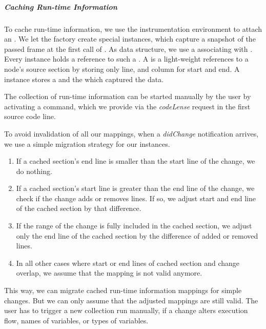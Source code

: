     \subparagraph{Caching Run-time Information}
    To cache run-time information, we use the instrumentation environment to attach an . We let the factory create special  instances, which capture a snapshot of the passed frame at the first call of . As data structure, we use a  associating  with . Every  instance holds a reference to such a . A  is a light-weight references to a node's source section by storing only line, and column for start and end. A  instance stores a  and the  which captured the data.

    The collection of run-time information can be started manually by the user by activating a command, which we provide via the \emph{codeLense} request in the first source code line.

    To avoid invalidation of all our mappings, when a \emph{didChange} notification arrives, we use a simple migration strategy for our  instances.

    \begin{enumerate}
        \item If a cached section's end line is smaller than the start line of the change, we do nothing.
        \item If a cached section's start line is greater than the end line of the change, we check if the change adds or removes lines. If so, we adjust start and end line of the cached section by that difference.
        \item If the range of the change is fully included in the cached section, we adjust only the end line of the cached section by the difference of added or removed lines.
        \item In all other cases where start or end lines of cached section and change overlap, we assume that the mapping is not valid anymore.
    \end{enumerate}

    This way, we can migrate cached run-time information mappings for simple changes. But we can only assume that the adjusted mappings are still valid. The user has to trigger a new collection run manually, if a change alters execution flow, names of variables, or types of variables.


